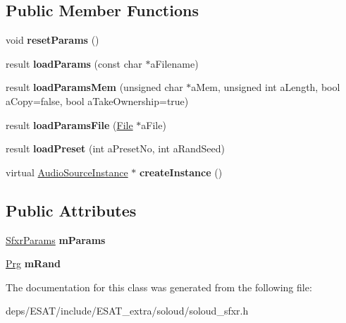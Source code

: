 \subsection*{Public Member Functions}
\begin{DoxyCompactItemize}
\item 
\mbox{\label{class_so_loud_1_1_sfxr_a5137ecc26f9d99a11a8c5cc0a31a2b81}} 
void {\bfseries reset\+Params} ()
\item 
\mbox{\label{class_so_loud_1_1_sfxr_a2f0d61ef7e75a28cb7ba3d93cce222b5}} 
result {\bfseries load\+Params} (const char $\ast$a\+Filename)
\item 
\mbox{\label{class_so_loud_1_1_sfxr_a0e66c7c1fbbb13eaec6c3f69043ed84f}} 
result {\bfseries load\+Params\+Mem} (unsigned char $\ast$a\+Mem, unsigned int a\+Length, bool a\+Copy=false, bool a\+Take\+Ownership=true)
\item 
\mbox{\label{class_so_loud_1_1_sfxr_a5f7e139d3456e480c4dd5e9f890d89c1}} 
result {\bfseries load\+Params\+File} (\mbox{\hyperlink{class_so_loud_1_1_file}{File}} $\ast$a\+File)
\item 
\mbox{\label{class_so_loud_1_1_sfxr_addbf8f2b5cc1606bf6b7662057ba363a}} 
result {\bfseries load\+Preset} (int a\+Preset\+No, int a\+Rand\+Seed)
\item 
\mbox{\label{class_so_loud_1_1_sfxr_a5e6ed4e55884624a70b271ae2ef4f8df}} 
virtual \mbox{\hyperlink{class_so_loud_1_1_audio_source_instance}{Audio\+Source\+Instance}} $\ast$ {\bfseries create\+Instance} ()
\end{DoxyCompactItemize}
\subsection*{Public Attributes}
\begin{DoxyCompactItemize}
\item 
\mbox{\label{class_so_loud_1_1_sfxr_a83a62945c9e6ee812a94c9f65e109e4e}} 
\mbox{\hyperlink{struct_so_loud_1_1_sfxr_params}{Sfxr\+Params}} {\bfseries m\+Params}
\item 
\mbox{\label{class_so_loud_1_1_sfxr_af63acb43327034d8be88d85418b86a5b}} 
\mbox{\hyperlink{class_so_loud_1_1_prg}{Prg}} {\bfseries m\+Rand}
\end{DoxyCompactItemize}


The documentation for this class was generated from the following file\+:\begin{DoxyCompactItemize}
\item 
deps/\+E\+S\+A\+T/include/\+E\+S\+A\+T\+\_\+extra/soloud/soloud\+\_\+sfxr.\+h\end{DoxyCompactItemize}
